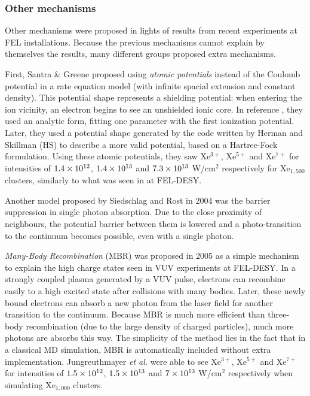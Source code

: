 \subsubsection{Other mechanisms}
Other mechanisms were proposed in lights of results from recent experiments at
FEL installations\cite{Wabnitz2002}. Because the previous mechanisms cannot
explain by themselves
the results, many different groups proposed extra mechanisms.


First, Santra \& Greene proposed using \textit{atomic potentials} instead of
the Coulomb potential in a rate equation model (with infinite spacial
extension and
constant density). This potential shape represents a shielding potential: when
entering the ion vicinity, an electron begins to see an unshielded ionic core.
In reference \cite{Greene2003}, they used an analytic form, fitting one
parameter
with the first ionization potential. Later\cite{Walters2006}, they used a
potential shape generated by the code written by Herman and
Skillman\cite{HS1963} (HS) to describe a more valid potential, based on a
Hartree-Fock formulation. Using these atomic potentials, they saw Xe$^{3+}$,
Xe$^{5+}$ and Xe$^{7+}$ for intensities of $\ten{1.4}{12}$, $\ten{1.4}{13}$ and
$\ten{7.3}{13}$ W/cm$^2$ respectively for Xe$_{1,500}$ clusters, similarly to
what was seen in at FEL-DESY.

Another model proposed by Siedschlag and Rost\cite{Siedschlag2004} in 2004 was
the barrier suppression in single photon absorption. Due to the close proximity
of neighbours, the potential barrier between them is lowered and
a photo-transition to the continuum becomes possible, even with a single photon.

\textit{Many-Body Recombination} (MBR) was proposed in 2005
as a simple mechanism to explain the high charge states seen in VUV
experiments at FEL-DESY\cite{Jungreuthmayer2005}. In a strongly coupled plasma
generated by a VUV pulse, electrons can recombine easily to a high excited
state after collisions with many bodies. Later, these newly bound electrons can
absorb a new photon from the laser field for another transition to the
continuum. Because MBR is much more efficient than three-body
recombination (due to the large density of charged particles), much more
photons are absorbs this way. The simplicity of the
method lies in the fact that in a classical MD simulation, MBR is automatically
included without extra implementation. Jungreuthmayer \textit{et al.} were able
to see Xe$^{3+}$, Xe$^{5+}$ and Xe$^{7+}$ for intensities of $\ten{1.5}{12}$,
$\ten{1.5}{13}$ and $\ten{7}{13}$ W/cm$^2$ respectively when simulating
Xe$_{1,000}$ clusters.


